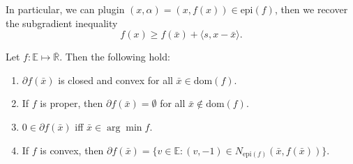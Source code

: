 \documentclass{tufte-handout}
\begin{document}
In particular, we can plugin \( (x, \alpha) = (x, f(x)) \in \text{epi}(f) \), 
then we recover the subgradient inequality
\[ f(x) \geq f(\bar x) + \langle s, x - \bar x \rangle. \]

\begin{Proposition}
    Let \( f:\mathbb{E}\mapsto \overline{\mathbb{R}} \). Then the following hold:
    \begin{enumerate}
        \item \( \partial f(\bar x) \) is closed and convex for all \( \bar x \in \text{dom}(f) \).
        \item If \( f \) is proper, then \( \partial f(\bar x) = \emptyset \) for all \( \bar x \notin \text{dom}(f) \).
        \item \( 0 \in \partial f(\bar x) \) iff \(\bar x \in \arg\min f\).
        \item If \( f \) is convex, then \( \partial f(\bar x) = \{ v \in \mathbb{E} :
        (v, -1) \in N_{\text{epi}(f)}(\bar x, f(\bar x)) \} \).
    \end{enumerate}
\end{Proposition}
\end{document}
